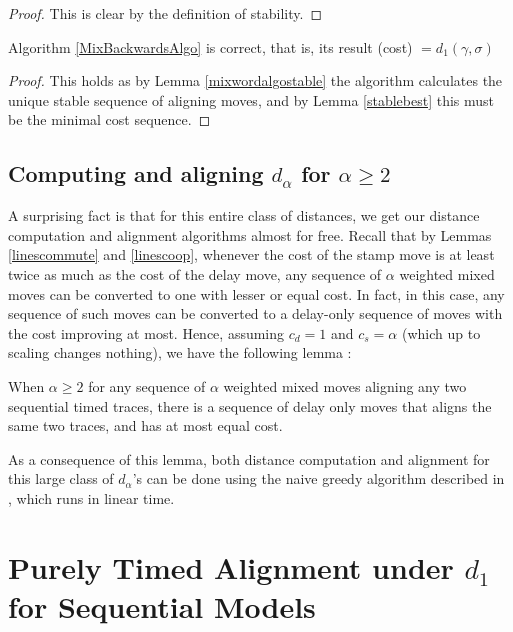 \documentclass[runningheads]{llncs}
\begin{document}
\begin{proof}
This is clear by the definition of stability. 
\end{proof}

\begin{theorem}\label{MixAlgoCorr} Algorithm \ref{MixBackwardsAlgo} is correct, that is, its result \textsf(cost) $ = d_1(\gamma, \sigma)$
\end{theorem}

\begin{proof}
This holds as by Lemma \ref{mixwordalgostable} the algorithm calculates the unique stable sequence of aligning moves, and by Lemma \ref{stablebest} this must be the minimal cost sequence. 
\end{proof}


\subsection{Computing and aligning $d_{\alpha}$ for $\alpha \geq 2$}\label{2.5}
A surprising fact is that for this entire class of distances, we get our distance computation and alignment algorithms almost for free. 
Recall that by Lemmas \ref{linescommute} and \ref{linescoop}, whenever the cost of the stamp move is at least twice as much as the cost of the delay move, any sequence of $\alpha$ weighted mixed moves can be converted to one with lesser or equal cost. 
In fact, in this case, any sequence of such moves can be converted to a delay-only sequence of moves with the cost improving at most. Hence, assuming $c_d = 1$ and $c_s = \alpha$ (which up to scaling changes nothing), we have the following lemma : 

\begin{lemma}\label{doubleisdelay} When $\alpha \geq 2$ for any sequence of $\alpha$ weighted mixed moves aligning any two sequential timed traces, there is a sequence of delay only moves that aligns the same two traces, and has at most equal cost. 
	
\end{lemma}

As a consequence of this lemma, both distance computation and alignment for this large class of $d_{\alpha}$'s can be done using the naive greedy algorithm described in \cite{CR22}, which runs in linear time. 

\section{Purely Timed Alignment under $d_1$ for Sequential Models}\label{4}
\end{document}
